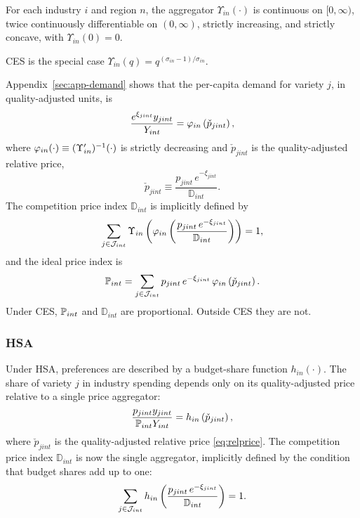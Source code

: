 \label{assum:hdia}
For each industry $i$ and region $n$, the aggregator $\Upsilon_{in}(\cdot)$ is continuous on $[0,\infty)$, twice continuously differentiable on $(0,\infty)$, strictly increasing, and strictly concave, with $\Upsilon_{in}(0) = 0$.
\eassu

CES is the special case $\Upsilon_{in}(q) = q^{(\sigma_{in} - 1)/\sigma_{in}}$.

Appendix~\ref{sec:app-demand} shows that the per-capita demand for variety $j$, in quality-adjusted units, is
\begin{equation}\label{eq:demand}
	\frac{e^{\xi_{jint}} y_{jint}}{Y_{int}} = \vp_{in}\left(\check{p}_{jint}\right),
\end{equation}
where $\vp_{in}(\cdot) \equiv (\Upsilon_{in}')^{-1}(\cdot)$ is strictly decreasing and $\check{p}_{jint}$ is the quality-adjusted relative price,
\begin{equation}\label{eq:relprice}
	\check{p}_{jint} \equiv \frac{p_{jint} \, e^{-\xi_{jint}}}{\mathbb{D}_{int}}.
\end{equation}
The competition price index $\mathbb{D}_{int}$ is implicitly defined by
\begin{equation}\label{eq:Dindex}
	\sum_{j \in \cJ_{int}} \Upsilon_{in}\left(\vp_{in}\left(\frac{p_{jint} \, e^{-\xi_{jint}}}{\mathbb{D}_{int}}\right)\right) = 1,
\end{equation}
and the ideal price index is
\begin{equation}\label{eq:Pindex}
	\P_{int} = \sum_{j \in \cJ_{int}} p_{jint} \, e^{-\xi_{jint}} \, \vp_{in}\left(\check{p}_{jint}\right).
\end{equation}
Under CES, $\P_{int}$ and $\mathbb{D}_{int}$ are proportional.
Outside CES they are not.

\subsubsection{HSA}\label{sec:hsa}

Under HSA, preferences are described by a budget-share function $h_{in}(\cdot)$.
The share of variety $j$ in industry spending depends only on its quality-adjusted price relative to a single price aggregator:
\begin{equation}\label{eq:hsa}
	\frac{p_{jint} y_{jint}}{\P_{int} Y_{int}} = h_{in}\left(\check{p}_{jint}\right),
\end{equation}
where $\check{p}_{jint}$ is the quality-adjusted relative price \eqref{eq:relprice}.
The competition price index $\mathbb{D}_{int}$ is now the single aggregator, implicitly defined by the condition that budget shares add up to one:
\begin{equation}\label{eq:hsaD}
	\sum_{j \in \cJ_{int}} h_{in}\left(\frac{p_{jint} \, e^{-\xi_{jint}}}{\mathbb{D}_{int}}\right) = 1.
\end{equation}

